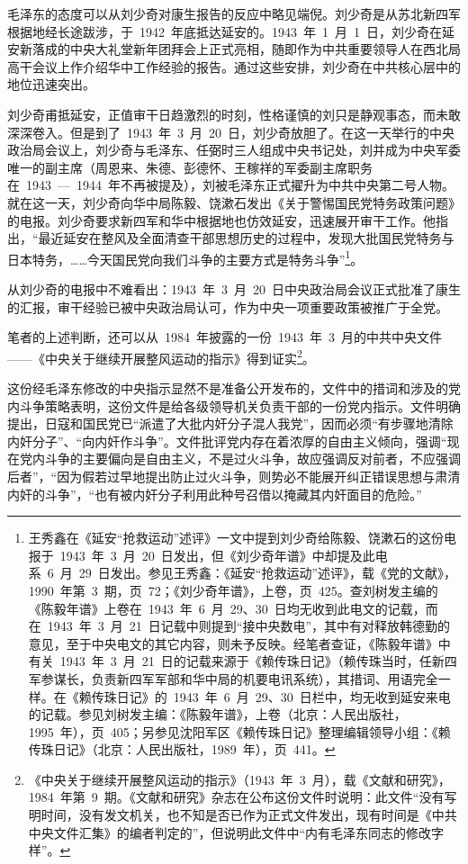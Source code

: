 毛泽东的态度可以从刘少奇对康生报告的反应中略见端倪。刘少奇是从苏北新四军根据地经长途跋涉，于~1942~年底抵达延安的。1943~年~1~月~1~日，刘少奇在延安新落成的中央大礼堂新年团拜会上正式亮相，随即作为中共重要领导人在西北局高干会议上作介绍华中工作经验的报告。通过这些安排，刘少奇在中共核心层中的地位迅速突出。

刘少奇甫抵延安，正值审干日趋激烈的时刻，性格谨慎的刘只是静观事态，而未敢深深卷入。但是到了~1943~年~3~月~20~日，刘少奇放胆了。在这一天举行的中央政治局会议上，刘少奇与毛泽东、任弼时三人组成中央书记处，刘并成为中央军委唯一的副主席（周恩来、朱德、彭德怀、王稼祥的军委副主席职务在~1943~—~1944~年不再被提及），刘被毛泽东正式擢升为中共中央第二号人物。就在这一天，刘少奇向华中局陈毅、饶漱石发出《关于警惕国民党特务政策问题》的电报。刘少奇要求新四军和华中根据地也仿效延安，迅速展开审干工作。他指出，“最近延安在整风及全面清查干部思想历史的过程中，发现大批国民党特务与日本特务，……今天国民党向我们斗争的主要方式是特务斗争”\footnote{王秀鑫在《延安“抢救运动”述评》一文中提到刘少奇给陈毅、饶漱石的这份电报于~1943~年~3~月~20~日发出，但《刘少奇年谱》中却提及此电系~6~月~29~日发出。参见王秀鑫：《延安“抢救运动”述评》，载《党的文献》，1990~年第~3~期，页~72；《刘少奇年谱》，上卷，页~425。查刘树发主编的《陈毅年谱》上卷在~1943~年~6~月~29、30~日均无收到此电文的记载，而在~1943~年~3~月~21~日记载中则提到“接中央数电”，其中有对释放韩德勤的意见，至于中央电文的其它内容，则未予反映。经笔者查证，《陈毅年谱》中有关~1943~年~3~月~21~日的记载来源于《赖传珠日记》（赖传珠当时，任新四军参谋长，负责新四军军部和华中局的机要电讯系统），其措词、用语完全一样。在《赖传珠日记》的~1943~年~6~月~29、30~日栏中，均无收到延安来电的记载。参见刘树发主编：《陈毅年谱》，上卷（北京：人民出版社，1995~年），页~405；另参见沈阳军区《赖传珠日记》整理编辑领导小组：《赖传珠日记》（北京：人民出版社，1989~年），页~441。}。

从刘少奇的电报中不难看出：1943~年~3~月~20~日中央政治局会议正式批准了康生的汇报，审干经验已被中央政治局认可，作为中央一项重要政策被推广于全党。

笔者的上述判断，还可以从~1984~年披露的一份~1943~年~3~月的中共中央文件——《中央关于继续开展整风运动的指示》得到证实\footnote{《中央关于继续开展整风运动的指示》（1943~年~3~月），载《文献和研究》，1984~年第~9~期。《文献和研究》杂志在公布这份文件时说明：此文件“没有写明时间，没有发文机关，也不知是否已作为正式文件发出，现有时间是《中共中央文件汇集》的编者判定的”，但说明此文件中“内有毛泽东同志的修改字样”。}。

这份经毛泽东修改的中央指示显然不是准备公开发布的，文件中的措词和涉及的党内斗争策略表明，这份文件是给各级领导机关负责干部的一份党内指示。文件明确提出，日寇和国民党已“派遣了大批内奸分子混人我党”，因而必须“有步骤地清除内奸分子”、“向内奸作斗争”。文件批评党内存在着浓厚的自由主义倾向，强调“现在党内斗争的主要偏向是自由主义，不是过火斗争，故应强调反对前者，不应强调后者”，“因为假若过早地提出防止过火斗争，则势必不能展开纠正错误思想与肃清内奸的斗争”，“也有被内奸分子利用此种号召借以掩藏其内奸面目的危险。”

